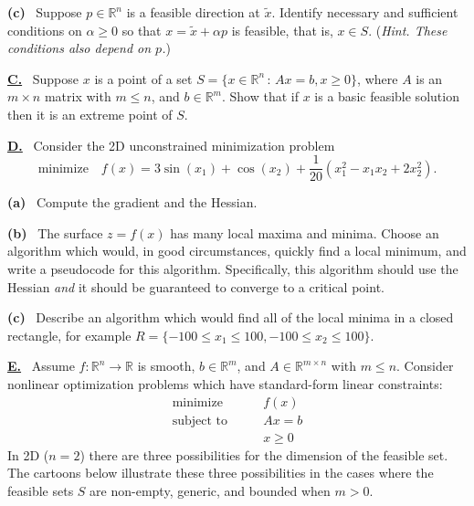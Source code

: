 \documentclass[11pt]{amsart}
\newcommand{\RR}{{\mathbb{R}}}
\newcommand{\prob}[1]{\bigskip\noindent\large\textbf{\underline{#1.}} \, \normalsize}
\newcommand{\epart}[1]{\medskip\noindent \textbf{(#1)} \,}
\begin{document}
\epart{c}  Suppose $p\in\RR^n$ is a feasible direction at $\tilde x$.  Identify necessary and sufficient conditions on $\alpha \ge 0$ so that $x = \tilde x + \alpha p$ is feasible, that is, $x\in S$.  (\emph{Hint.  These conditions also depend on $p$.})


\prob{C}  Suppose $x$ is a point of a set $S = \{x \in \RR^n\,:\,Ax=b, x\ge 0\}$, where $A$ is an $m\times n$ matrix with $m\le n$, and $b\in\RR^m$.  Show that if $x$ is a basic feasible solution then it is an extreme point of $S$.


\prob{D}  Consider the 2D unconstrained minimization problem
    $$\text{minimize} \quad f(x)=3\sin(x_1)+\cos(x_2) + \frac{1}{20} \left(x_1^2 - x_1 x_2 + 2 x_2^2\right).$$

\epart{a} Compute the gradient and the Hessian.

\epart{b} The surface $z=f(x)$ has many local maxima and minima.  Choose an algorithm which would, in good circumstances, quickly find a local minimum, and write a pseudocode for this algorithm.  Specifically, this algorithm should use the Hessian \emph{and} it should be guaranteed to converge to a critical point.

\epart{c} Describe an algorithm which would find all of the local minima in a closed rectangle, for example $R=\{-100\le x_1 \le 100, -100\le x_2 \le 100\}$.


\prob{E}  Assume $f:\RR^n\to\RR$ is smooth, $b\in \RR^m$, and $A\in \RR^{m\times n}$ with $m\le n$.  Consider nonlinear optimization problems which have standard-form linear constraints:
    $$\begin{matrix}
    \text{minimize} \qquad & f(x) \\
    \text{subject to} \qquad & Ax = b \\
                      & x \ge 0
    \end{matrix}$$
In 2D ($n=2$) there are three possibilities for the dimension of the feasible set.  The cartoons below illustrate these three possibilities in the cases where the feasible sets $S$ are non-empty, generic, and bounded when $m>0$.

\bigskip
{}
\qquad
{}
\qquad
{}
\end{document}
